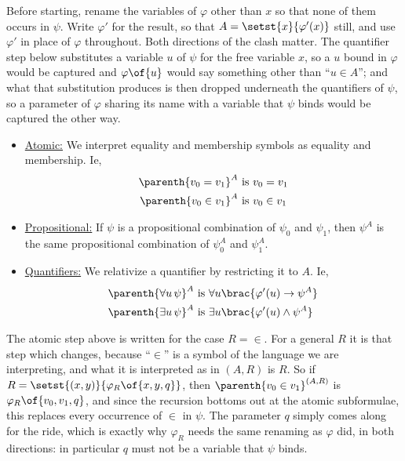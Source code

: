 Before starting, rename the variables of $\varphi$ other than $x$ so that none of them occurs in $\psi$. Write $\varphi'$ for the result, so that $A = \setst{x}{\varphi'(x)}$ still, and use $\varphi'$ in place of $\varphi$ throughout. Both directions of the clash matter. The quantifier step below substitutes a variable $u$ of $\psi$ for the free variable $x$, so a $u$ bound in $\varphi$ would be captured and $\varphi\of{u}$ would say something other than ``$u \in A$''; and what that substitution produces is then dropped underneath the quantifiers of $\psi$, so a parameter of $\varphi$ sharing its name with a variable that $\psi$ binds would be captured the other way.
\begin{itemize}
    \item \underline{Atomic:} We interpret equality and membership symbols as equality and membership. Ie,
    \begin{align*}
        \parenth{v_0 = v_1}^A &\text{ is } v_0 = v_1 \\
        \parenth{v_0 \in v_1}^A &\text{ is } v_0 \in v_1 
    \end{align*}

    \item \underline{Propositional:} If $\psi$ is a propositional combination of $\psi_0$ and $\psi_1$, then $\psi^A$ is the same propositional combination of $\psi_0^A$ and $\psi_1^A$.

    \item \underline{Quantifiers:} We relativize a quantifier by restricting it to $A$. Ie,
    \begin{align*}
        \parenth{\forall u \, \psi}^A &\text{ is } \forall u \brac{\varphi'(u) \to \psi^A} \\
        \parenth{\exists u \, \psi}^A &\text{ is } \exists u \brac{\varphi'(u) \land \psi^A}
    \end{align*}
\end{itemize}

The atomic step above is written for the case $R = \in$. For a general $R$ it is that step which changes, because ``$\in$'' is a symbol of the language we are interpreting, and what it is interpreted as in $(A, R)$ is $R$. So if $R = \setst{(x, y)}{\varphi_R\of{x, y, q}}$, then $\parenth{v_0 \in v_1}^{(A, R)}$ is $\varphi_R\of{v_0, v_1, q}$, and since the recursion bottoms out at the atomic subformulae, this replaces every occurrence of $\in$ in $\psi$. The parameter $q$ simply comes along for the ride, which is exactly why $\varphi_R$ needs the same renaming as $\varphi$ did, in both directions: in particular $q$ must not be a variable that $\psi$ binds.


